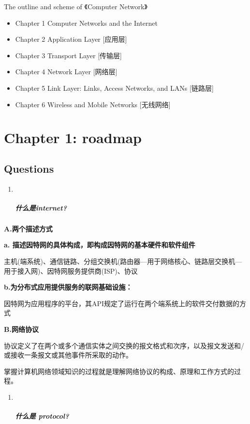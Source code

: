 \documentclass[
]{article}
\author{}
\date{}
\begin{document}
The outline and scheme of 《Computer Network》

\begin{itemize}
\item
  Chapter 1 Computer Networks and the Internet
\item
  Chapter 2 Application Layer {[}应用层{]}
\item
  Chapter 3 Transport Layer {[}传输层{]}
\item
  Chapter 4 Network Layer {[}网络层{]}
\item
  Chapter 5 Link Layer: Links, Access Networks, and LANs {[}链路层{]}
\item
  Chapter 6 Wireless and Mobile Networks {[}无线网络{]}
\end{itemize}

\hypertarget{chapter-1-roadmap}{%
\section{Chapter 1: roadmap}\label{chapter-1-roadmap}}

\hypertarget{questions}{%
\subsection{Questions}\label{questions}}

\begin{enumerate}
\def\labelenumi{\arabic{enumi}.}
\item ~
  \hypertarget{ux4ec0ux4e48ux662finternet}{%
  \subparagraph{什么是internet?}\label{ux4ec0ux4e48ux662finternet}}
\end{enumerate}

\textbf{A.两个描述方式}

\textbf{a. 描述因特网的具体构成，即构成因特网的基本硬件和软件组件}

主机(端系统)、通信链路、分组交换机(路由器---用于网络核心、链路层交换机---用于接入网)、因特网服务提供商(ISP)、协议

\textbf{b.为分布式应用提供服务的联网基础设施：}

因特网为应用程序的平台，其API规定了运行在两个端系统上的软件交付数据的方式

\textbf{B.网络协议}

协议定义了在两个或多个通信实体之间交换的报文格式和次序，以及报文发送和/或接收一条报文或其他事件所采取的动作。

掌握计算机网络领域知识的过程就是理解网络协议的构成、原理和工作方式的过程。

\begin{enumerate}
\def\labelenumi{\arabic{enumi}.}
\item ~
  \hypertarget{ux4ec0ux4e48ux662f-protocol}{%
  \subparagraph{什么是 protocol?}\label{ux4ec0ux4e48ux662f-protocol}}
\end{enumerate}
\end{document}
